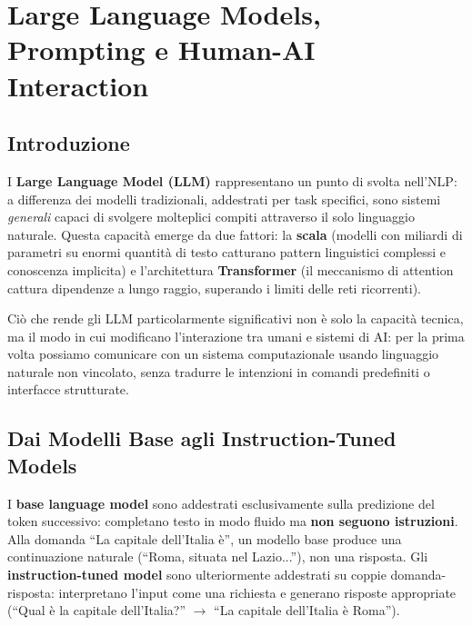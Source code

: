 \documentclass[12pt,a4paper]{article}
\begin{document}
\section{Large Language Models, Prompting e Human-AI Interaction}

\subsection{Introduzione}

I \textbf{Large Language Model (LLM)} rappresentano un punto di svolta nell'NLP: a differenza dei modelli tradizionali, addestrati per task specifici, sono sistemi \emph{generali} capaci di svolgere molteplici compiti attraverso il solo linguaggio naturale. Questa capacit\`a emerge da due fattori: la \textbf{scala} (modelli con miliardi di parametri su enormi quantit\`a di testo catturano pattern linguistici complessi e conoscenza implicita) e l'architettura \textbf{Transformer} (il meccanismo di attention cattura dipendenze a lungo raggio, superando i limiti delle reti ricorrenti).

\begin{quizbox}
Ci\`o che rende gli LLM particolarmente significativi non \`e solo la capacit\`a tecnica, ma il modo in cui modificano l'interazione tra umani e sistemi di AI: per la prima volta possiamo comunicare con un sistema computazionale usando linguaggio naturale non vincolato, senza tradurre le intenzioni in comandi predefiniti o interfacce strutturate.
\end{quizbox}

\subsection{Dai Modelli Base agli Instruction-Tuned Models}

\begin{defbox}
I \textbf{base language model} sono addestrati esclusivamente sulla predizione del token successivo: completano testo in modo fluido ma \textbf{non seguono istruzioni}. Alla domanda ``La capitale dell'Italia \`e'', un modello base produce una continuazione naturale (``Roma, situata nel Lazio...''), non una risposta. Gli \textbf{instruction-tuned model} sono ulteriormente addestrati su coppie domanda-risposta: interpretano l'input come una richiesta e generano risposte appropriate (``Qual \`e la capitale dell'Italia?'' $\to$ ``La capitale dell'Italia \`e Roma'').
\end{defbox}
\end{document}
